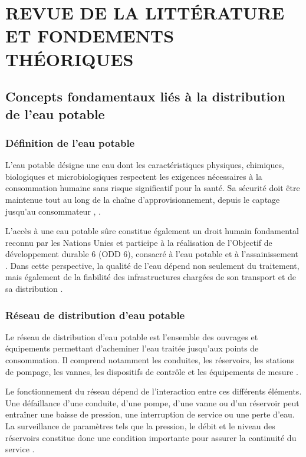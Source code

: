 \chapter{REVUE DE LA LITTÉRATURE ET FONDEMENTS THÉORIQUES}
\label{chapitre-i-revue-de-la-litterature-et-fondements-theoriques}

\section{Concepts fondamentaux liés à la distribution de l'eau potable}
\label{concepts-fondamentaux-lies-a-la-distribution-de-leau-potable}

\subsection{Définition de l'eau potable}
\label{definition-de-leau-potable}

L'eau potable désigne une eau dont les caractéristiques physiques,
chimiques, biologiques et microbiologiques respectent les exigences
nécessaires à la consommation humaine sans risque significatif pour la
santé. Sa sécurité doit être maintenue tout au long de la chaîne
d'approvisionnement, depuis le captage jusqu'au consommateur
\cite{ref4}, \cite{ref23}.

L'accès à une eau potable sûre constitue également un droit humain
fondamental reconnu par les Nations Unies et participe à la réalisation
de l'Objectif de développement durable 6 (ODD 6), consacré à l'eau
potable et à l'assainissement \cite{ref3}. Dans cette perspective, la
qualité de l'eau dépend non seulement du traitement, mais également de
la fiabilité des infrastructures chargées de son transport et de sa
distribution \cite{ref1}.

\subsection{Réseau de distribution d'eau potable}
\label{reseau-de-distribution-deau-potable}

Le réseau de distribution d'eau potable est l'ensemble des ouvrages et
équipements permettant d'acheminer l'eau traitée jusqu'aux points de
consommation. Il comprend notamment les conduites, les réservoirs, les
stations de pompage, les vannes, les dispositifs de contrôle et les
équipements de mesure \cite{ref11}.

Le fonctionnement du réseau dépend de l'interaction entre ces différents
éléments. Une défaillance d'une conduite, d'une pompe, d'une vanne ou
d'un réservoir peut entraîner une baisse de pression, une interruption
de service ou une perte d'eau. La surveillance de paramètres tels que
la pression, le débit et le niveau des réservoirs constitue donc une
condition importante pour assurer la continuité du service \cite{ref20}.

